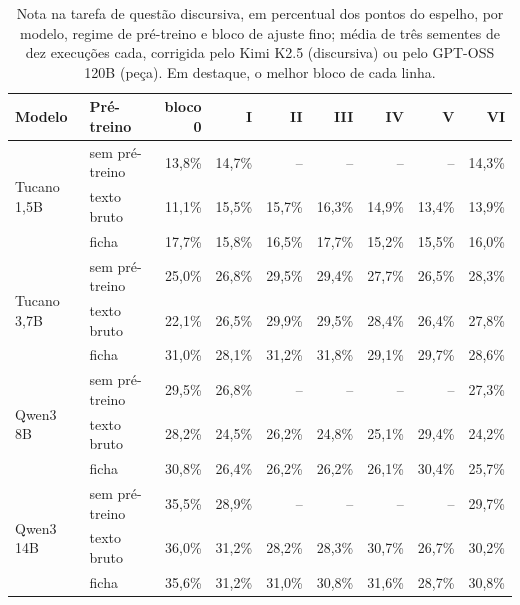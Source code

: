 \documentclass{IOS-Book-Article}
\begin{document}
\begin{table}[!ht]
\centering
\caption{Nota na tarefa de questão discursiva, em percentual dos pontos do espelho, por modelo, regime de pré-treino e bloco de ajuste fino; média de três sementes de dez execuções cada, corrigida pelo Kimi K2.5 (discursiva) ou pelo GPT-OSS 120B (peça). Em destaque, o melhor bloco de cada linha.}
\footnotesize\setlength{\tabcolsep}{3pt}
\begin{tabular}{llrrrrrrr}
\hline
\textbf{Modelo} & \textbf{Pré-treino} & \textbf{bloco 0} & \textbf{I} & \textbf{II} & \textbf{III} & \textbf{IV} & \textbf{V} & \textbf{VI} \\
\hline
\multirow{3}{*}{Tucano 1,5B} & sem pré-treino & 13,8\% & 14,7\% & -- & -- & -- & -- & 14,3\% \\
 & texto bruto & 11,1\% & 15,5\% & 15,7\% & 16,3\% & 14,9\% & 13,4\% & 13,9\% \\
 & ficha & 17,7\% & 15,8\% & 16,5\% & 17,7\% & 15,2\% & 15,5\% & 16,0\% \\
\multirow{3}{*}{Tucano 3,7B} & sem pré-treino & 25,0\% & 26,8\% & 29,5\% & 29,4\% & 27,7\% & 26,5\% & 28,3\% \\
 & texto bruto & 22,1\% & 26,5\% & 29,9\% & 29,5\% & 28,4\% & 26,4\% & 27,8\% \\
 & ficha & 31,0\% & 28,1\% & 31,2\% & 31,8\% & 29,1\% & 29,7\% & 28,6\% \\
\multirow{3}{*}{Qwen3 8B} & sem pré-treino & 29,5\% & 26,8\% & -- & -- & -- & -- & 27,3\% \\
 & texto bruto & 28,2\% & 24,5\% & 26,2\% & 24,8\% & 25,1\% & 29,4\% & 24,2\% \\
 & ficha & 30,8\% & 26,4\% & 26,2\% & 26,2\% & 26,1\% & 30,4\% & 25,7\% \\
\multirow{3}{*}{Qwen3 14B} & sem pré-treino & 35,5\% & 28,9\% & -- & -- & -- & -- & 29,7\% \\
 & texto bruto & 36,0\% & 31,2\% & 28,2\% & 28,3\% & 30,7\% & 26,7\% & 30,2\% \\
 & ficha & 35,6\% & 31,2\% & 31,0\% & 30,8\% & 31,6\% & 28,7\% & 30,8\% \\
\hline
\end{tabular}
\end{table}
\end{document}
